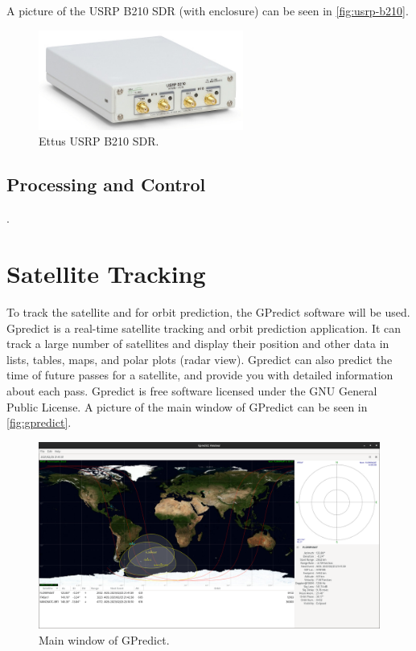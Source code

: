 A picture of the USRP B210 SDR (with enclosure) can be seen in \autoref{fig:usrp-b210}.

\begin{figure}[!ht]
    \begin{center}
        \includegraphics[width=0.6\textwidth]{figures/usrp-b210.jpg}
        \caption{Ettus USRP B210 SDR.}
        \label{fig:usrp-b210}
    \end{center}
\end{figure}

\subsection{Processing and Control}

.

\section{Satellite Tracking}

To track the satellite and for orbit prediction, the GPredict software \cite{gpredict} will be used. Gpredict is a real-time satellite tracking and orbit prediction application. It can track a large number of satellites and display their position and other data in lists, tables, maps, and polar plots (radar view). Gpredict can also predict the time of future passes for a satellite, and provide you with detailed information about each pass. Gpredict is free software licensed under the GNU General Public License. A picture of the main window of GPredict can be seen in \autoref{fig:gpredict}.

\begin{figure}[!ht]
    \begin{center}
        \includegraphics[width=\textwidth]{figures/gpredict.png}
        \caption{Main window of GPredict.}
        \label{fig:gpredict}
    \end{center}
\end{figure}

